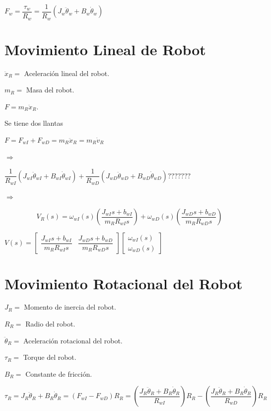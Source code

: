 $F_{w} = \dfrac{\tau_{w}}{R_{w}} = \dfrac{1}{R_{w}}\left( J_{w}\ddot{\theta}_{w} + B_{w}\dot{\theta}_{w} \right)$ 




\section{Movimiento Lineal de Robot}

$\ddot{x}_{R} = $ Aceleración lineal del robot.

$m_{R} = $ Masa del robot.

$F = m_{R}\ddot{x}_{R}$.

Se tiene dos llantas

$F = F_{wI} + F_{wD} = m_{R}\ddot{x}_{R} = m_{R}\dot{v}_{R}$

$\Rightarrow$

$\dfrac{1}{R_{wI}} \left( J_{wI}\ddot{\theta}_{wI} + B_{wI}\dot{\theta}_{wI}\right) + \dfrac{1}{R_{wD}} \left( J_{wD}\ddot{\theta}_{wD} + B_{wD}\dot{\theta}_{wD}\right)???????$

$\Rightarrow$


$$V_{R}(s) = \omega_{wI}(s)\left( \dfrac{J_{wI}s + b_{wI}}{m_{R}R_{wI}s} \right) + \omega_{wD}(s)\left( \dfrac{J_{wD}s + b_{wD}}{m_{R}R_{wD}s} \right)$$

$
V(s) = \begin{bmatrix}
\dfrac{J_{wI}s + b_{wI}}{m_{R}R_{wI}s} & \dfrac{J_{wD}s + b_{wD}}{m_{R}R_{wD}s}  
\end{bmatrix} \begin{bmatrix}
 \omega_{wI}(s) \\
 \omega_{wD}(s)  
\end{bmatrix}
$


\section{Movimiento Rotacional del Robot}

$J_{R} = $ Momento de inercia del robot.

$R_{R} = $ Radio del robot.

$\ddot{\theta}_{R} = $ Aceleración rotacional del robot.

$\tau_{R} = $ Torque del robot.

$B_{R} = $ Constante de fricción.

$\tau_{R} = J_{R}\ddot{\theta}_{R} + B_{R}\dot{\theta}_{R} = (F_{wI} - F_{wD}) R_{R} = \left( \dfrac{J_{R}\ddot{\theta}_{R} + B_{R}\dot{\theta}_{R}}{R_{wI}} \right) R_{R} - \left( \dfrac{J_{R}\ddot{\theta}_{R} + B_{R}\dot{\theta}_{R}}{R_{wD}} \right)R_{R}$

